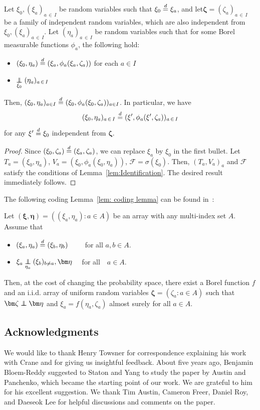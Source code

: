 \documentclass[AHL,Unicode,longabstracts,published]{cedram}
\newcommand{\independent}{\protect\mathpalette{\protect\independenT}{\perp}}\def\independenT#1#2{\mathrel{\rlap{$#1#2$}\mkern2mu{#1#2}}}
\renewcommand{\d}{\buildrel{d}\over{=}}
\newcommand*\FF{\mathcal{F}}
\begin{document}
\begin{lemm}\label{lem:joining}
Let $\xi_0, (\xi_a)_{a\,\in\,I}$ be random variables such that $\xi_0 \d \xi_a$, and let\linebreak$\bm{\zeta}=(\zeta_a)_{a\,\in\,I}$ be a family of independent random variables, which are also independent from $\xi_0, (\xi_a)_{a\,\in\,I}$. Let $(\eta_a)_{a\,\in\,I}$ be random variables such that for some Borel measurable functions $\phi_a$, the following hold:
\begin{itemize}
\item $(\xi_0,\eta_a) \d (\xi_a,\phi_a(\xi_a,\zeta_a))$ for each $a \in I$
\item $\underset{\xi_0}{\independent}(\eta_a)_{a\,\in \,I}$
\end{itemize}
Then, $(\xi_0,\eta_a)_{a\in I} \d (\xi_0,\phi_a(\xi_0,\zeta_a))_{a\in I}$. In particular, we have
\[
(\xi_0,\eta_a)_{a\,\in\,I} \d(\xi',\phi_a(\xi',\zeta_a))_{a\,\in\,I}
\]
for any $\xi'\d\xi_0$ independent from $\bm\zeta$.
\end{lemm}

\begin{proof}
Since $(\xi_0, \zeta_a) \d (\xi_a, \zeta_a)$, we can replace $\xi_a$ by $\xi_0$ in the first bullet. 
Let $T_a=(\xi_0, \eta_a)$, $V_a=(\xi_0, \phi_a(\xi_0, \eta_a))$, $\FF=\sigma(\xi_0)$. Then, $(T_a,V_a)_a$ and $\FF$ satisfy the conditions of Lemma~\ref{lem:Identification}. The desired result immediately follows.
\end{proof}


The following coding Lemma~\ref{lem: coding lemma} can be found in~\cite[Lemma~7.6]{kallenberg2006probabilistic}:


\goodbreak
\begin{lemm}\label{lem: coding lemma}
Let $(\bm\xi,\bm\eta)=((\xi_a,\eta_a):a \in A)$ be an array with any multi-index set $A$. Assume that
\begin{itemize}
\item $(\xi_a,\eta_a) \d (\xi_b,\eta_b)\qquad$ for all $a,b \in A$.
\item $\xi_a \underset{\eta_a}{\independent} (\xi_b)_{b \neq a}, \bm\eta\quad$ for all$\quad a\in A$.
\end{itemize}
Then, at the cost of changing the probability space, there exist a Borel function $f$ and an i.i.d. array of uniform random variables $\bm\zeta=(\zeta_a: a \in A)$ such that $\bm\zeta \independent \bm\eta$ and $\xi_a=f(\eta_a,\zeta_a)$ almost surely for all $a\in A$.
\end{lemm}


\subsection*{Acknowledgments}

We would like to thank Henry Towsner for correspondence explaining his work with Crane and for giving us insightful feedback. About five years ago, Benjamin Bloem-Reddy suggested to Staton and Yang to study the paper by Austin and Panchenko, which became the starting point of our work. We are grateful to him for his excellent suggestion. We thank Tim Austin, Cameron Freer, Daniel Roy, and Daeseok Lee for helpful discussions and comments on the paper. 



\end{document}
